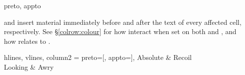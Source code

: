\begin{codedescribe}[
    key,
    new=2021K
  ]{preto, appto}
  \begin{codesyntax}
  \end{codesyntax}
   and  insert material immediately before and after the text of every affected cell, respectively. See \S\ref{colrow:colour} for how  interact when set on both  and , and how  relates to .

  \begin{codestore}[st=columns:pretoappto]
    \begin{tblr}{
      hlines, vlines,
      column{2} = {preto={[}, appto={]}},
      }
      Absolute & Recoil \\
      Looking  & Awry
    \end{tblr}\end{codestore}
  \begin{center}
  \end{center}
\end{codedescribe}

